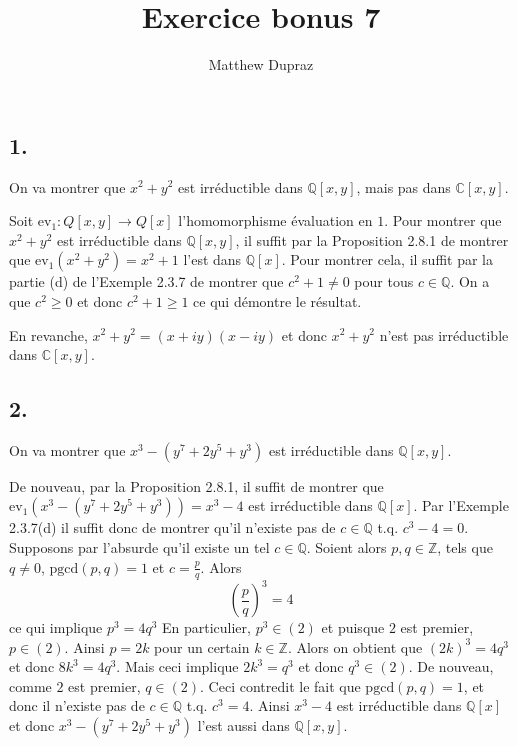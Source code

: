\documentclass{article}
\title{Exercice bonus 7}
\author{Matthew Dupraz}
\newcommand{\Q}{\mathbb{Q}}
\newcommand{\C}{\mathbb{C}}
\newcommand{\Z}{\mathbb{Z}}
\newcommand{\ev}{\mathrm{ev}}
\newcommand{\pgcd}{\mathrm{pgcd}}
\begin{document}
\maketitle

\subsection*{1.}

On va montrer que $x^2 + y^2$ est irréductible dans
$\Q[x, y]$, mais pas dans $\C[x, y]$.

Soit $\ev_1: Q[x, y] \to Q[x]$ l'homomorphisme évaluation en $1$.
Pour montrer que $x^2 + y^2$ est irréductible dans $\Q[x, y]$,
il suffit par la Proposition 2.8.1 de montrer que
$\ev_1(x^2 + y^2) = x^2 + 1$ l'est dans $\Q[x]$.
Pour montrer cela, il suffit par la partie (d) de l'Exemple 2.3.7
de montrer que $c^2 + 1 \neq 0$ pour tous $c \in \Q$.
On a que $c^2 \geq 0$ et donc $c^2 + 1 \geq 1$ ce qui démontre le
résultat.

En revanche, $x^2 + y^2 = (x + iy)(x - iy)$ et donc $x^2 + y^2$
n'est pas irréductible dans $\C[x, y]$.

\subsection*{2.}

On va montrer que $x^3 - (y^7 + 2y^5 + y^3)$ est irréductible dans
$\Q[x, y]$.

De nouveau, par la Proposition 2.8.1, il suffit de montrer que
$\ev_1(x^3 - (y^7 + 2y^5 + y^3)) = x^3 - 4$ est irréductible dans
$\Q[x]$.
Par l'Exemple 2.3.7(d) il suffit donc de montrer qu'il n'existe pas
de $c \in \Q$ t.q. $c^3 - 4 = 0$. Supposons par l'absurde qu'il
existe un tel $c \in \Q$. Soient alors $p, q \in \Z$, tels que 
$q \neq 0$, $\pgcd(p, q) = 1$ et $c = \frac{p}{q}$.
Alors 
\begin{equation*}
	\left(\frac{p}{q}\right)^3 = 4
\end{equation*}
ce qui implique $p^3 = 4q^3$
En particulier, $p^3 \in (2)$ et puisque $2$ est
premier, $p \in (2)$. Ainsi $p = 2k$ pour un certain $k \in \Z$.
Alors on obtient que $(2k)^3 = 4q^3$ et donc
$8k^3 = 4q^3$. Mais ceci implique $2k^3 = q^3$ et donc
$q^3 \in (2)$. De nouveau, comme $2$ est premier, 
$q \in (2)$. Ceci contredit le fait que $\pgcd(p, q) = 1$, et
donc il n'existe pas de $c\in \Q$ t.q. $c^3 = 4$.
Ainsi $x^3 - 4$ est irréductible dans $\Q[x]$ et donc
$x^3 - (y^7 + 2y^5 + y^3)$ l'est aussi dans $\Q[x, y]$.
\end{document}
